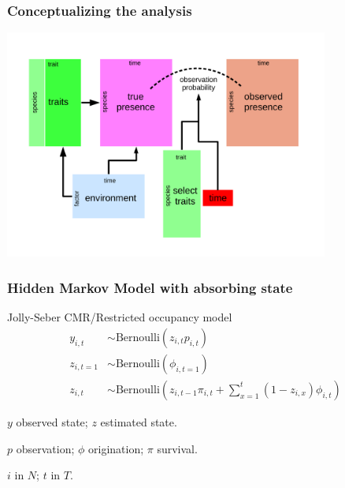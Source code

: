 \documentclass[aspectratio=169]{beamer}
\begin{document}
\begin{frame}
  \frametitle{Conceptualizing the analysis}
  \begin{center}
    \includegraphics[width=0.8\textwidth,height=\textheight,keepaspectratio=true]{figure/paleo_fourth_corner}
  \end{center}
\end{frame}


\begin{frame}
  \frametitle{Hidden Markov Model with absorbing state}
  \begin{block}{Jolly-Seber CMR/Restricted occupancy model}
    \begin{align*}
      y_{i, t} &\sim \text{Bernoulli}(z_{i, t} p_{i, t}) \\
      z_{i, t = 1} &\sim \text{Bernoulli}(\phi_{i, t = 1}) \\
      z_{i, t} &\sim \text{Bernoulli}\left(z_{i, t - 1} \pi_{i,t} + \sum_{x = 1}^{t}(1 - z_{i, x}) \phi_{i, t}\right)
    \end{align*}
    \begin{scriptsize}
      \(y\) observed state; \(z\) estimated state.

      \(p\) observation; \(\phi\) origination; \(\pi\) survival.

      \(i\) in \(N\); \(t\) in \(T\).
    \end{scriptsize}
  \end{block}
\end{frame}
\end{document}
